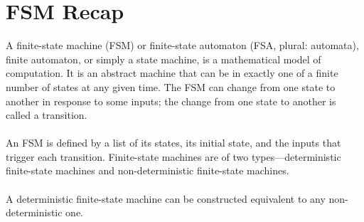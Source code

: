\documentclass[12pt,a4paper]{article}
\begin{document}
\section{FSM Recap}
    A finite-state machine (FSM) or finite-state automaton (FSA, plural: automata), 
    finite automaton, or simply a state machine, is a mathematical model of computation. 
    It is an abstract machine that can be in exactly one of a finite number of states at 
    any given time. The FSM can change from one state to another in response to some inputs; 
    the change from one state to another is called a transition.\\\\
    [1] An FSM is defined by a list of its states, its initial state, and the inputs that trigger each transition. 
    Finite-state machines are of two types—deterministic finite-state machines and non-deterministic finite-state machines.\\\\ 
    A deterministic finite-state machine can be constructed equivalent to any non-deterministic one.
        \\\\
    \begin{center}\end{center}
\end{document}
